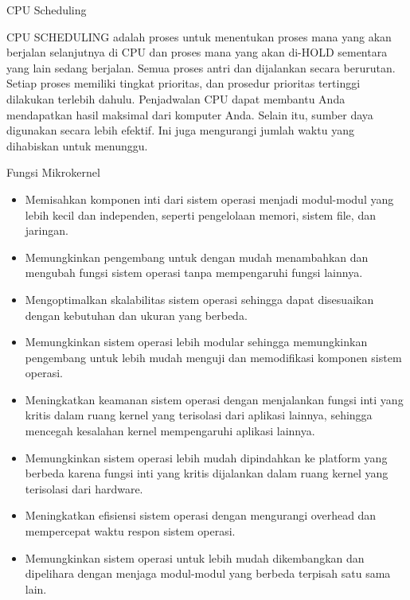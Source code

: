 \documentclass{beamer}
\begin{document}
	\begin{frame}{CPU Scheduling}
	
	CPU SCHEDULING adalah proses untuk menentukan proses mana yang akan berjalan selanjutnya di CPU dan proses mana yang akan di-HOLD sementara yang lain sedang berjalan. Semua proses antri dan dijalankan secara berurutan. Setiap proses memiliki tingkat prioritas, dan prosedur prioritas tertinggi dilakukan terlebih dahulu. Penjadwalan CPU dapat membantu Anda mendapatkan hasil maksimal dari komputer Anda. Selain itu, sumber daya digunakan secara lebih efektif. Ini juga mengurangi jumlah waktu yang dihabiskan untuk menunggu.
	
	\end{frame}
	
	\begin{frame}{Fungsi Mikrokernel}
	\begin{itemize}
		\item Memisahkan komponen inti dari sistem operasi menjadi modul-modul yang lebih kecil dan independen, seperti pengelolaan memori, sistem file, dan jaringan.
		
		\item Memungkinkan pengembang untuk dengan mudah menambahkan dan mengubah fungsi sistem operasi tanpa mempengaruhi fungsi lainnya.
		
		\item Mengoptimalkan skalabilitas sistem operasi sehingga dapat disesuaikan dengan kebutuhan dan ukuran yang berbeda.
		
		\item Memungkinkan sistem operasi lebih modular sehingga memungkinkan pengembang untuk lebih mudah menguji dan memodifikasi komponen sistem operasi.
		
		\item Meningkatkan keamanan sistem operasi dengan menjalankan fungsi inti yang kritis dalam ruang kernel yang terisolasi dari aplikasi lainnya, sehingga mencegah kesalahan kernel mempengaruhi aplikasi lainnya.
		
		\item Memungkinkan sistem operasi lebih mudah dipindahkan ke platform yang berbeda karena fungsi inti yang kritis dijalankan dalam ruang kernel yang terisolasi dari hardware.
		
		\item Meningkatkan efisiensi sistem operasi dengan mengurangi overhead dan mempercepat waktu respon sistem operasi.
		
		\item Memungkinkan sistem operasi untuk lebih mudah dikembangkan dan dipelihara dengan menjaga modul-modul yang berbeda terpisah satu sama lain.
		

\end{itemize}
\end{frame}
\end{document}
